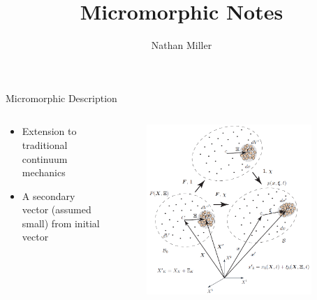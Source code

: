 \documentclass[11pt]{beamer}
\author[N. Miller]{Nathan Miller}
\title{Micromorphic Notes}
\begin{document}
{

\begin{frame}[noframenumbering]
\titlepage
\end{frame}
}
\begin{frame}{Micromorphic Description}
\begin{columns}
\begin{column}{0.5\textwidth}
\begin{itemize}
\item Extension to traditional continuum mechanics
\item A secondary vector (assumed small) from initial vector
\end{itemize}
\end{column}
\begin{column}{0.5\textwidth}
\begin{figure}
\centering
\includegraphics[width=0.9\textwidth]{micromorphic.png}
\end{figure}
\end{column}
\end{columns}
\end{frame}
\end{document}
